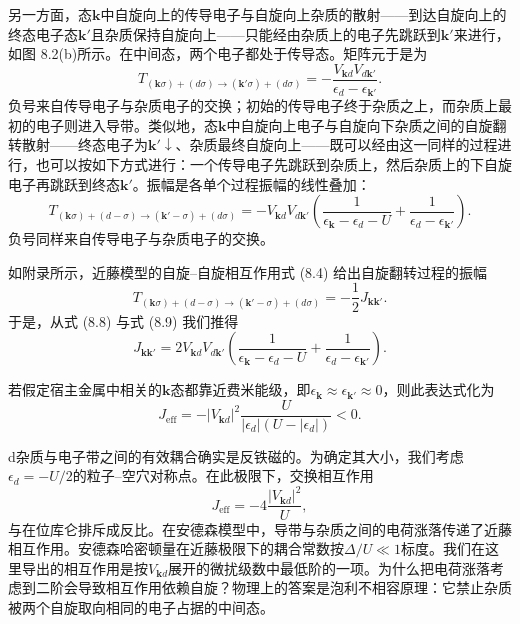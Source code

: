另一方面，态$\mathbf{k}$中自旋向上的传导电子与自旋向上杂质的散射——到达自旋向上的终态电子态$\mathbf{k}'$且杂质保持自旋向上——只能经由杂质上的电子先跳跃到$\mathbf{k}'$来进行，如图 8.2(b)所示。在中间态，两个电子都处于传导态。矩阵元于是为
\begin{equation*}
T_{(\mathbf{k}\sigma)+(d\sigma)\to(\mathbf{k}'\sigma)+(d\sigma)} = -\frac{V_{\mathbf{k}d}V_{d\mathbf{k}'}}{\epsilon_d-\epsilon_{\mathbf{k}'}}.
\tag{8.7}
\end{equation*}
负号来自传导电子与杂质电子的交换；初始的传导电子终于杂质之上，而杂质上最初的电子则进入导带。类似地，态$\mathbf{k}$中自旋向上电子与自旋向下杂质之间的自旋翻转散射——终态电子为$\mathbf{k}'\downarrow$、杂质最终自旋向上——既可以经由这一同样的过程进行，也可以按如下方式进行：一个传导电子先跳跃到杂质上，然后杂质上的下自旋电子再跳跃到终态$\mathbf{k}'$。振幅是各单个过程振幅的线性叠加：
\begin{equation*}
T_{(\mathbf{k}\sigma)+(d-\sigma)\to(\mathbf{k}'-\sigma)+(d\sigma)} = -V_{\mathbf{k}d}V_{d\mathbf{k}'}\left(\frac{1}{\epsilon_{\mathbf{k}}-\epsilon_d-U}+\frac{1}{\epsilon_d-\epsilon_{\mathbf{k}'}}\right).
\tag{8.8}
\end{equation*}
负号同样来自传导电子与杂质电子的交换。

如附录所示，近藤模型的自旋–自旋相互作用式 (8.4) 给出自旋翻转过程的振幅
\begin{equation*}
T_{(\mathbf{k}\sigma)+(d-\sigma)\to(\mathbf{k}'-\sigma)+(d\sigma)} = -\frac{1}{2}J_{\mathbf{k}\mathbf{k}'}.
\tag{8.9}
\end{equation*}
于是，从式 (8.8) 与式 (8.9) 我们推得
\begin{equation*}
J_{\mathbf{k}\mathbf{k}'} = 2V_{\mathbf{k}d}V_{d\mathbf{k}'}\left(\frac{1}{\epsilon_{\mathbf{k}}-\epsilon_d-U}+\frac{1}{\epsilon_d-\epsilon_{\mathbf{k}'}}\right).
\tag{8.10}
\end{equation*}

若假定宿主金属中相关的$\mathbf{k}$态都靠近费米能级，即$\epsilon_{\mathbf{k}}\approx\epsilon_{\mathbf{k}'}\approx 0$，则此表达式化为
\begin{equation*}
J_{\mathrm{eff}} = -|V_{\mathbf{k}d}|^2\frac{U}{|\epsilon_d|(U-|\epsilon_d|)} < 0.
\tag{8.11}
\end{equation*}

d杂质与电子带之间的有效耦合确实是反铁磁的。为确定其大小，我们考虑$\epsilon_d=-U/2$的粒子–空穴对称点。在此极限下，交换相互作用
\begin{equation*}
J_{\mathrm{eff}} = -4\frac{|V_{\mathbf{k}d}|^2}{U},
\tag{8.12}
\end{equation*}
与在位库仑排斥成反比。在安德森模型中，导带与杂质之间的电荷涨落传递了近藤相互作用。安德森哈密顿量在近藤极限下的耦合常数按$\Delta/U\ll 1$标度。我们在这里导出的相互作用是按$V_{\mathbf{k}d}$展开的微扰级数中最低阶的一项。为什么把电荷涨落考虑到二阶会导致相互作用依赖自旋？物理上的答案是泡利不相容原理：它禁止杂质被两个自旋取向相同的电子占据的中间态。

